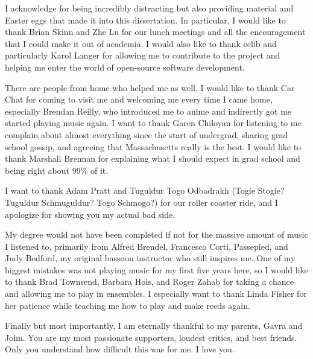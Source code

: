 \documentclass[%
  class = article,%
  crop = false,%
  float = true,%
  multi = true,%
  preview = false,%
]{standalone}
\begin{document}
I acknowledge \href{https://chemistry.stackexchange.com/users/194/}{\color{black}{Chemistry Stack Exchange}} for being incredibly distracting but also providing material and Easter eggs that made it into this dissertation. In particular, I would like to thank Brian Skinn and Zhe Lu for our lunch meetings and all the encouragement that I could make it out of academia. I would also like to thank cclib and particularly Karol Langer for allowing me to contribute to the project and helping me enter the world of open-source software development.

There are people from home who helped me as well. I would like to thank Car Chat for coming to visit me and welcoming me every time I came home, especially Brendan Reilly, who introduced me to anime and indirectly got me started playing music again. I want to thank Garen Chiloyan for listening to me complain about almost everything since the start of undergrad, sharing grad school gossip, and agreeing that Massachusetts really is the best. I would like to thank Marshall Brennan for explaining what I should expect in grad school and being right about 99\% of it.

I want to thank Adam Pratt and Tuguldur Togo Odbadrakh (Togie Stogie? Tuguldur Schmuguldur? Togo Schmogo?) for our roller coaster ride, and I apologize for showing you my actual bad side.

My degree would not have been completed if not for the massive amount of music I listened to, primarily from Alfred Brendel, Francesco Corti, Passepied, and Judy Bedford, my original bassoon instructor who still inspires me. One of my biggest mistakes was not playing music for my first five years here, so I would like to thank Brad Townsend, Barbara Hois, and Roger Zahab for taking a chance and allowing me to play in ensembles. I especially want to thank Linda Fisher for her patience while teaching me how to play and make reeds again.

Finally but most importantly, I am eternally thankful to my parents, Gavra and John. You are my most passionate supporters, loudest critics, and best friends. Only you understand how difficult this was for me. I love you.
\end{document}
